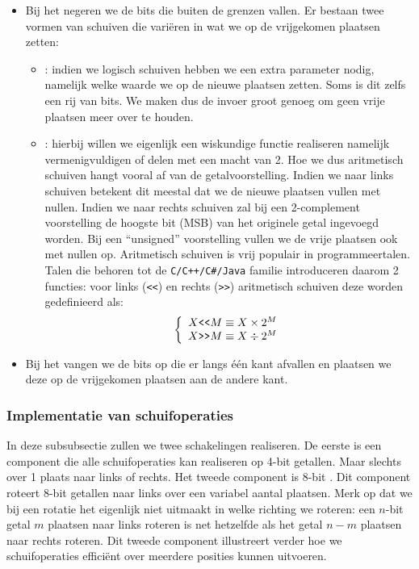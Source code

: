 \begin{itemize}
 \item Bij het  negeren we de bits die buiten de grenzen vallen. Er bestaan twee vormen van schuiven die vari\"eren in wat we op de vrijgekomen plaatsen zetten:
 \begin{itemize}
   \item {}: indien we logisch schuiven hebben we een extra parameter nodig, namelijk welke waarde we op de nieuwe plaatsen zetten. Soms is dit zelfs een rij van bits. We maken dus de invoer groot genoeg om geen vrije plaatsen meer over te houden.
   \item {}: hierbij willen we eigenlijk een wiskundige functie realiseren namelijk vermenigvuldigen of delen met een macht van 2. Hoe we dus aritmetisch schuiven hangt vooral af van de getalvoorstelling. Indien we naar links schuiven betekent dit meestal dat we de nieuwe plaatsen vullen met nullen. Indien we naar rechts schuiven zal bij een 2-complement voorstelling de hoogste bit (MSB) van het originele getal ingevoegd worden. Bij een ``unsigned'' voorstelling vullen we de vrije plaatsen ook met nullen op. Aritmetisch schuiven is vrij populair in programmeertalen. Talen die behoren tot de \verb|C/C++/C#/Java| familie introduceren daarom 2 functies: voor links (\verb+<<+) en rechts (\verb+>>+) aritmetisch schuiven deze worden gedefinieerd als:
\begin{equation}
\left\{\begin{array}{l}
X\verb+<<+M\equiv X\times 2^M\\
X\verb+>>+M\equiv X\div 2^M
\end{array}\right.
\end{equation}
 \end{itemize}
 \item Bij het  vangen we de bits op die er langs \'e\'en kant afvallen en plaatsen we deze op de vrijgekomen plaatsen aan de andere kant.
\end{itemize}
\subsubsection{Implementatie van schuifoperaties}
In deze subsubsectie zullen we twee schakelingen realiseren. De eerste is een component die alle schuifoperaties kan realiseren op 4-bit getallen. Maar slechts over 1 plaats naar links of rechts. Het tweede component is 8-bit . Dit component roteert 8-bit getallen naar links over een variabel aantal plaatsen. Merk op dat we bij een rotatie het eigenlijk niet uitmaakt in welke richting we roteren: een $n$-bit getal $m$ plaatsen naar links roteren is net hetzelfde als het getal $n-m$ plaatsen naar rechts roteren. Dit tweede component illustreert verder hoe we schuifoperaties effici\"ent over meerdere posities kunnen uitvoeren.
